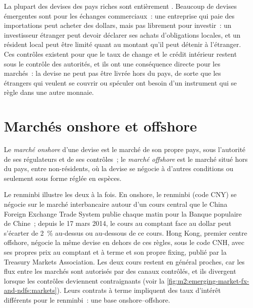 La plupart des devises des pays riches sont entièrement . Beaucoup de devises émergentes
sont  pour les échanges commerciaux~: une entreprise qui paie des importations peut acheter
des dollars, mais pas librement pour investir~: un investisseur étranger peut devoir déclarer
ses achats d'obligations locales, et un résident local peut être limité quant au montant
qu'il peut détenir à l'étranger. Ces contrôles existent pour que le taux de change et le
crédit intérieur restent sous le contrôle des autorités, et ils ont une conséquence directe pour
les marchés~: la devise ne peut pas être livrée hors du pays, de sorte que les étrangers qui
veulent se couvrir ou spéculer ont besoin d'un instrument qui se règle dans une autre monnaie.

\section{Marchés onshore et offshore}

\begin{definition}\label{def:m2:emerging-market-fx-and-ndfs:onshore}
Le \emph{marché onshore} d'une devise est le marché de
son propre pays, sous l'autorité de ses régulateurs et de ses contrôles~; le \emph{marché
offshore} est le marché situé hors du pays, entre non-résidents,
où la devise se négocie à d'autres conditions ou seulement sous forme réglée en espèces.
\end{definition}

Le renminbi illustre les deux à la fois. En onshore, le renminbi (code CNY) se négocie sur le
marché interbancaire autour d'un cours central que le China Foreign Exchange Trade
System publie chaque matin pour la Banque populaire de Chine~; depuis le 17 mars
2014, le cours au comptant face au dollar peut s'écarter de 2~\% au-dessus ou au-dessous de ce cours. Hong
Kong, premier centre offshore, négocie la même devise en dehors de ces règles,
sous le code CNH, avec ses propres prix au comptant et à terme et son propre fixing, publié par
la Treasury Markets Association. Les deux cours restent en général proches, car
les flux entre les marchés sont autorisés par des canaux contrôlés, et ils divergent
lorsque les contrôles deviennent contraignants (voir la \cref{fig:m2:emerging-market-fx-and-ndfs:markets}).
Leurs contrats à terme impliquent des taux d'intérêt différents pour le renminbi~: une
base onshore--offshore.

